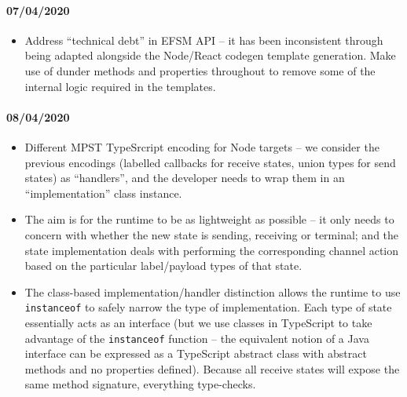 \documentclass{article}
\begin{document}
\paragraph{07/04/2020}
\begin{itemize}
\item
Address ``technical debt'' in EFSM API -- it has
been inconsistent through being adapted alongside
the Node/React codegen template generation. 
Make use of dunder methods and properties
throughout to remove some of the internal logic
required in the templates.

\end{itemize}

\paragraph{08/04/2020}
\begin{itemize}
\item
Different MPST TypeSrcript encoding for Node targets --
we consider the previous encodings (labelled callbacks for
receive states, union types for send states) as ``handlers'',
and the developer needs to wrap them in an ``implementation''
class instance.

\item
The aim is for the runtime to be as lightweight as possible
-- it only needs to concern with whether the new state
is sending, receiving or terminal; and the state implementation
deals with performing the corresponding channel action
based on the particular label/payload types of that state.

\item
The class-based implementation/handler distinction allows
the runtime to use \texttt{instanceof} to safely narrow the
type of implementation. Each type of state essentially acts as
an interface (but we use classes in TypeScript to take advantage
of the \texttt{instanceof} function -- the equivalent notion
of a Java interface can be expressed as a TypeScript abstract
class with abstract methods and no properties defined). Because
all receive states will expose the same method signature,
everything type-checks.

\end{itemize}
\end{document}
